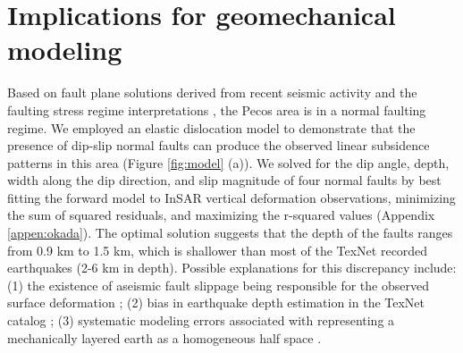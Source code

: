 \section{Implications for geomechanical modeling}
Based on fault plane solutions derived from recent seismic activity and the faulting stress regime interpretations \citep{LundSnee2018StateStressPermian}, the Pecos area is in a normal faulting regime. We employed an elastic dislocation model \citep{Okada1992InternalDeformationDue} to demonstrate that the presence of dip-slip normal faults can produce the observed linear subsidence patterns in this area (Figure \ref{fig:model} (a)). We solved for the dip angle, depth, width along the dip direction, and slip magnitude of four normal faults by best fitting the forward model to InSAR vertical deformation observations, minimizing the sum of squared residuals, and maximizing the r-squared values \citep{Du1992ComparisonVariousInversion} (Appendix \ref{appen:okada}). The optimal solution suggests that the depth of the faults ranges from 0.9 km to 1.5 km, which is shallower than most of the TexNet recorded earthquakes (2-6 km in depth). Possible explanations for this discrepancy include: (1) the existence of aseismic fault slippage being responsible for the observed surface deformation \citep{McGarr2017WastewaterDisposalEarthquake}; (2) bias in earthquake depth estimation in the TexNet catalog \citep{Lomax2019ImprovingAbsoluteEarthquake}; (3) systematic modeling errors associated with representing a mechanically layered earth as a homogeneous half space \citep{Du1992ComparisonVariousInversion}. 




